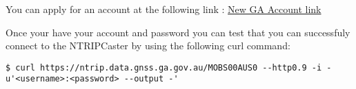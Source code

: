 You can apply for an account at the following link : \href{https://gnss-users-prod.auth.ap-southeast-2.amazoncognito.com/login?response_type=code&client_id=11njl767q0tl1faf9qna469vl1&redirect_uri=https://search-gnss-elasticsearch-prod-5omhch5quzlu5dcpbct4ev5qz4.ap-southeast-2.es.amazonaws.com/_plugin/kibana/app/kibana&state=e36b2054-7ace-4931-91a3-5ba6de893917}{New GA Account link}

Once your have your account and password you can test that you can successfuly connect to the NTRIPCaster by using the following curl command:
\begin{Verbatim}
$ curl https://ntrip.data.gnss.ga.gov.au/MOBS00AUS0 --http0.9 -i -u'<username>:<password> --output -'
\end{Verbatim}

